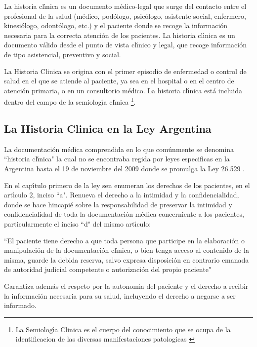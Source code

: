 La historia cl\'{\i}nica es un documento m\'edico-legal que surge del contacto entre el 
profesional de la salud (m\'edico, pod\'ologo, psic\'ologo, asistente social, enfermero, 
kinesi\'ologo, odont\'ologo, etc.) y el paciente donde se recoge la informaci\'on necesaria 
para la correcta atenci\'on de los pacientes. La historia cl\'{\i}nica es un documento 
v\'alido desde el punto de vista cl\'{\i}nico y legal, que recoge informaci\'on de tipo 
asistencial, preventivo y social.

La Historia Clinica se origina con el primer episodio de enfermedad o control de salud en 
el que se atiende al paciente, ya sea en el hospital o en el centro de atenci\'on primaria, 
o en un consultorio m\'edico. La historia cl\'{\i}nica est\'a incluida dentro del campo de la 
semiolog\'{\i}a cl\'{\i}nica \footnote{La Semiolog\'{\i}a Clinica es el cuerpo del conocimiento
que se ocupa de la identificacion de las diversas manifestaciones patologicas 
\cite{SemiClin}}.

\subsection{La Historia Clinica en la Ley Argentina}

La documentaci\'on m\'edica comprendida en lo que com\'unmente se denomina ``historia 
cl\'{\i}nica" la cual no se encontraba regida por leyes especificas en la Argentina hasta
el 19 de noviembre del 2009 donde se promulga la Ley 26.529 \cite{LeyHC}.

En el cap\'{\i}tulo primero de la ley sen enumeran los derechos de los pacientes, 
en el art\'{\i}culo 2, inciso ``a". Renueva el derecho a la intimidad y la confidencialidad, 
donde se hace hincapi\'e sobre la responsabilidad de preservar la intimidad y 
confidencialidad de toda la documentaci\'on m\'edica concerniente a los pacientes, 
particularmente el inciso ``d" del mismo art\'{\i}culo:

``El paciente tiene derecho a que toda persona que participe en la elaboraci\'on 
o manipulaci\'on de la documentaci\'on cl\'{\i}nica, o bien tenga acceso al contenido de 
la misma, guarde la debida reserva, salvo expresa disposici\'on en contrario 
emanada de autoridad judicial competente o autorizaci\'on del propio paciente"

Garantiza adem\'as el respeto por la autonom\'{\i}a del paciente y el derecho a recibir 
la informaci\'on necesaria para su salud, incluyendo el derecho a negarse a ser 
informado.

